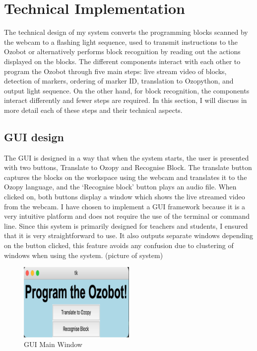 \documentclass[oneside,%
                    author={Malak Hajji},
                    degree={BSc},
                    title={Designing An Accessible Ozobot Programming Platform for Students},
                  subtitle={With Mixed Visual Abilities}]{dissertation}
\begin{document}
\section{Technical Implementation}
The technical design of my system converts the programming blocks scanned by the webcam to a flashing light sequence, used to transmit instructions to the Ozobot or alternatively performs block recognition by reading out the actions displayed on the blocks. The different components interact with each other to program the Ozobot through five main steps: live stream video of blocks, detection of markers, ordering of marker ID, translation to Ozopython, and output light sequence. On the other hand, for block recognition, the components interact differently and fewer steps are required. In this section, I will discuss in more detail each of these steps and their technical aspects. 
 
\subsection{GUI design} 
 
The GUI is designed in a way that when the system starts, the user is presented with two buttons, Translate to Ozopy and Recognise Block. The translate button captures the blocks on the workspace using the webcam and translates it to the Ozopy language, and the ‘Recognise block’ button plays an audio file. When clicked on, both buttons display a window which shows the live streamed video from the webcam.  
I have chosen to implement a GUI framework because it is a very intuitive platform and does not require the use of the terminal or command line. Since this system is primarily designed for teachers and students, I ensured that it is very straightforward to use. It also outputs separate windows depending on the button clicked, this feature avoids any confusion due to clustering of windows when using the system.  
(picture of system)
\FloatBarrier
\begin{figure}[h]
    \centering
    \includegraphics[width=0.5\textwidth]{thesis/gui.eps}
    \caption{GUI Main Window}
    \label{fig-gui}
\end{figure}
\FloatBarrier
\end{document}
